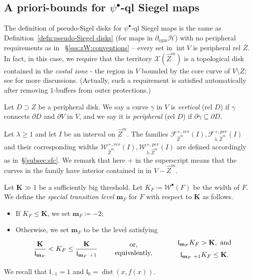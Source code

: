\documentclass[11pt, reqno]{amsart}
\numberwithin{equation}{section}
\theoremstyle{plain}
\theoremstyle{theorem}
\theoremstyle{plain}
\theoremstyle{definition}
\DeclareMathOperator{\dist}{dist}
\numberwithin{figure}{section}
\newcommand{\hide}[1]{}
\renewcommand{\sp}{{\ \ }}
\newcommand{\Fam}{{\mathcal F}}
\newcommand{\Width}{{\mathcal W}}
\newcommand\XX{\mathcal{X}}
\newcommand\intr{\operatorname{int}}
\newcommand{\wZ}{{\widehat Z}}
\newcommand{\egm}{{\operatorname{egm}}}
\newcommand{\bK}{{\mathbf K}}
\newcommand{\bbm}{{\mathbf m}}
\newcommand{\length}{{\mathfrak l}}
\begin{document}
\subsection{A priori-bounds for  $\psi^\bullet$-ql Siegel maps}\label{subsec:aprioribounds}
\hide{Let $F$ be an eventually-golden-mean $\psi^\bullet$-ql map as in~\S\ref{sss:qlb:Defn}.
We say that a disk $D\supset Z$ is {\em peripheral rel $\overline Z$} if $D\subset V$. Similar to~\S\ref{sss:zW:conventions}, a set $S\subset V$ is {\em peripheral rel $\overline Z$} if $S$ is within a peripheral disk $D$.} 

The definition of pseudo-Sigel disks for $\psi^\bullet$-ql Siegel maps is the same as Definition~\ref{defn:pseudo-Siegel disks} (for maps in $\partial_\egm \mathcal H$) with no peripheral requirements as in ~\S\ref{sss:zW:conventions} -- every set in $\intr V$ is peripheral rel $\overline Z$. In fact, in this case, we require that the territory $\XX(\wZ^m)$ is a topological disk contained in the {\em costal zone} - the region in $V$ bounded by the core curve of $V\setminus Z$; see \cite[\S3.5]{DLL25} for more discussions. (Actually, such a requirement is satisfied automatically after removing $1$-buffers from outer protections.)



Let $D\supset Z$ be a peripheral disk.
We say a curve $\gamma$ in $V$ is {\em vertical} (rel $D$) if $\gamma$ connects $\partial D$ and $\partial V$ in $V$, and we say it is {\em peripheral} (rel $D$) if $\partial \gamma \subseteq \partial D$. 

Let $\lambda \geq 1$ and let $I$ be an interval on $\wZ^m$.
The families $\Fam^{+,ver}_{\wZ^m}(I), \Fam^{+,per}_{\lambda, \wZ^m}(I)$ and their corresponding widths $\Width^{+,ver}_{\wZ^m}(I), \Width^{+,per}_{\lambda, \wZ^m}(I)$ are defined accordingly as in~\S\ref{subsec:sfc}. We remark that here $+$ in the superscript means that the curves in the family have interior contained in in $V - \wZ^m$.

Let $\bK\gg 1$ be a sufficiently big threshold.
Let $K_F\coloneqq \Width^\bullet(F)$ be the width of $F$.
We define the {\em special transition level} $\bbm_F$ for $F$ with respect to $\bK$ as follows. 
\begin{itemize}
    \item If $K_F\le \bK$, we set $\bbm_F\coloneqq -2$;
    \item Otherwise, we set $\bbm_F$ to be the level satisfying 
\[ \frac{\bK}{\length_{\bbm_F}} < K_F \le \frac{\bK}{\length_{\bbm_F\ +1}} \sp\sp\sp  \begin{array}{c}\text{ or, }\\ \text{equivalently,}\end{array}\sp\sp\sp \sp   \begin{array}{c}
\length_{\bbm_F} K_F>\bK, \text{ and}\vspace{0.2cm}\\
\length_{\bbm_F\ +1} K_F\le \bK.
\end{array} \]
\end{itemize} 
We recall that $\length_{-1}=1$ and $\length_0=\dist(x, f(x))$.
\end{document}
